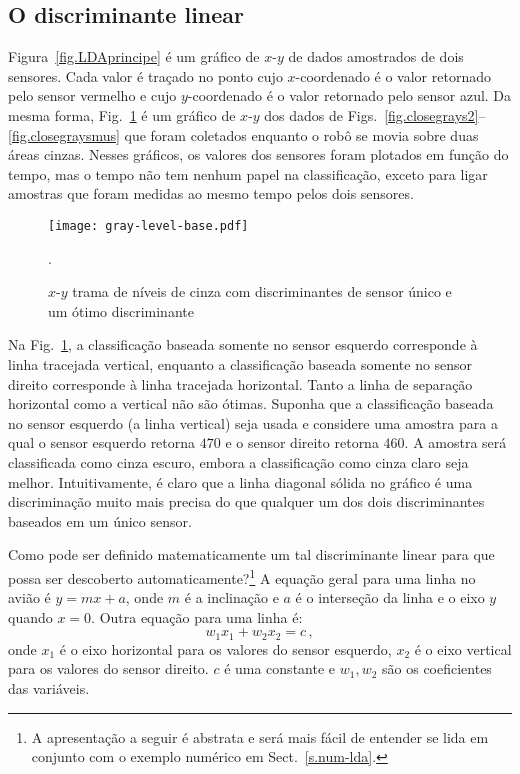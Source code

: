 \subsection{O discriminante linear}

Figura~\ref{fig.LDAprincipe} é um gráfico de $x$-$y$ de dados amostrados de dois sensores. Cada valor é traçado no ponto cujo $x$-coordenado é o valor retornado pelo sensor vermelho e cujo $y$-coordenado é o valor retornado pelo sensor azul. Da mesma forma, Fig.~\ref{fig.gray-x-y} é um gráfico de $x$-$y$ dos dados de Figs.~\ref{fig.closegrays2}--\ref{fig.closegraysmus} que foram coletados enquanto o robô se movia sobre duas áreas cinzas.  Nesses gráficos, os valores dos sensores foram plotados em função do tempo, mas o tempo não tem nenhum papel na classificação, exceto para ligar amostras que foram medidas ao mesmo tempo pelos dois sensores.

\begin{figure}
\begin{center}
\texttt{[image: gray-level-base.pdf]}
\end{center}
\caption{$x$-$y$ trama de níveis de cinza com discriminantes de sensor único e um ótimo discriminante}\label{fig.gray-x-y}.
\end{figure}

Na Fig.~\ref{fig.gray-x-y}, a classificação baseada somente no sensor esquerdo corresponde à linha tracejada vertical, enquanto a classificação baseada somente no sensor direito corresponde à linha tracejada horizontal. Tanto a linha de separação horizontal como a vertical não são ótimas. Suponha que a classificação baseada no sensor esquerdo (a linha vertical) seja usada e considere uma amostra para a qual o sensor esquerdo retorna $470$ e o sensor direito retorna $460$. A amostra será classificada como cinza escuro, embora a classificação como cinza claro seja melhor. Intuitivamente, é claro que a linha diagonal sólida no gráfico é uma discriminação muito mais precisa do que qualquer um dos dois discriminantes baseados em um único sensor.

Como pode ser definido matematicamente um tal discriminante linear para que possa ser descoberto automaticamente?\footnote{A apresentação a seguir é abstrata e será mais fácil de entender se lida em conjunto com o exemplo numérico em Sect.~\ref{s.num-lda}.} A equação geral para uma linha no avião é $y=mx+a$, onde $m$ é a inclinação e $a$ é o interseção da linha e o eixo $y$ quando $x=0$. Outra equação para uma linha é:
\begin{equation}
w_1x_1 + w_2x_2 = c\,,\label{eq.diseq}
\end{equation}
onde $x_1$ é o eixo horizontal para os valores do sensor esquerdo, $x_2$ é o eixo vertical para os valores do sensor direito. $c$ é uma constante e $w_1,w_2$ são os coeficientes das variáveis.

